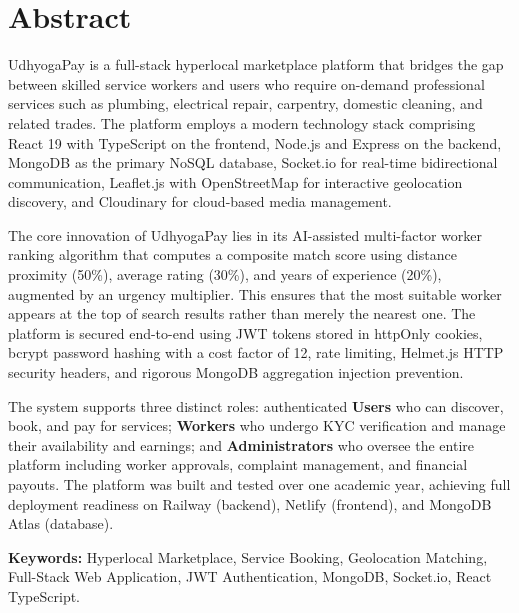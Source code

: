 \documentclass[12pt,a4paper]{report}
\begin{document}
\chapter*{Abstract}

UdhyogaPay is a full-stack hyperlocal marketplace platform that bridges the gap between skilled service workers and users who require on-demand professional services such as plumbing, electrical repair, carpentry, domestic cleaning, and related trades. The platform employs a modern technology stack comprising React 19 with TypeScript on the frontend, Node.js and Express on the backend, MongoDB as the primary NoSQL database, Socket.io for real-time bidirectional communication, Leaflet.js with OpenStreetMap for interactive geolocation discovery, and Cloudinary for cloud-based media management.

The core innovation of UdhyogaPay lies in its AI-assisted multi-factor worker ranking algorithm that computes a composite match score using distance proximity (50\%), average rating (30\%), and years of experience (20\%), augmented by an urgency multiplier. This ensures that the most suitable worker appears at the top of search results rather than merely the nearest one. The platform is secured end-to-end using JWT tokens stored in httpOnly cookies, bcrypt password hashing with a cost factor of 12, rate limiting, Helmet.js HTTP security headers, and rigorous MongoDB aggregation injection prevention.

The system supports three distinct roles: authenticated \textbf{Users} who can discover, book, and pay for services; \textbf{Workers} who undergo KYC verification and manage their availability and earnings; and \textbf{Administrators} who oversee the entire platform including worker approvals, complaint management, and financial payouts. The platform was built and tested over one academic year, achieving full deployment readiness on Railway (backend), Netlify (frontend), and MongoDB Atlas (database).

\vspace{0.5cm}
\noindent\textbf{Keywords:} Hyperlocal Marketplace, Service Booking, Geolocation Matching, Full-Stack Web Application, JWT Authentication, MongoDB, Socket.io, React TypeScript.

\tableofcontents
\listoftables
\newpage
\end{document}
